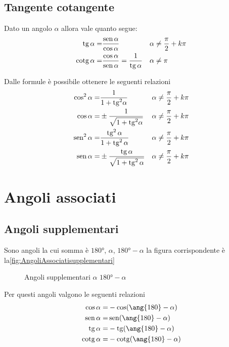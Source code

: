 \subsection{Tangente cotangente}
\label{sec:TangenteCotangente}
\begin{definizione}
	Dato un angolo $\alpha$ allora vale quanto segue:
\begin{align}
\operatorname{tg}\alpha=&{}\dfrac{\operatorname{sen}\alpha}{\cos\alpha}&\alpha&{}\neq\dfrac{\pi}{2}+k\pi\label{equ:tangente1}\\
\operatorname{cotg}\alpha=&{}\dfrac{\cos\alpha}{\operatorname{sen}\alpha}={}\dfrac{1}{\operatorname{tg}\alpha}& \alpha&{}\neq\pi\label{equ:cotangente1}
\end{align}
\end{definizione}
Dalle formule\nobs{} è possibile ottenere le seguenti relazioni
\begin{align}
\cos^{2}\alpha=&{}\dfrac{1}{1+{\operatorname{tg}}^{2}\alpha} &\alpha&{}\neq\dfrac{\pi}{2}+k\pi\\
\cos\alpha=&{}\pm\dfrac{1}{\sqrt{1+{\operatorname{tg}}^{2}\alpha}} &\alpha{}&\neq\dfrac{\pi}{2}+k\pi\\
\operatorname{sen}^{2}\alpha=&{}\dfrac{\operatorname{tg}^{2}\alpha}{1+\operatorname{tg}^{2}\alpha}&\alpha{}&\neq\dfrac{\pi}{2}+k\pi\\
\operatorname{sen}\alpha=&{}\pm\dfrac{\operatorname{tg}\alpha}{\sqrt{1+\operatorname{tg}^{2}\alpha}}&\alpha{}&\neq\dfrac{\pi}{2}+k\pi
\end{align}
\section{Angoli associati}
\label{sec:goniometriaAngoliAssociati}
\subsection{Angoli supplementari}
Sono angoli la cui somma è $\ang{180}$, $\alpha$, $\ang{180}-\alpha$ la figura corrispondente è la\nobs\vref{fig:AngoliAssociatisupplementari}
\begin{figure}[H]
	\centering

	\caption{Angoli supplementari $\alpha$ $\ang{180}-\alpha$}
	\label{fig:AngoliAssociatisupplementari}
\end{figure}
Per questi angoli valgono le seguenti relazioni
\begin{align}
\cos\alpha=&{}-\cos(\ang{180}-\alpha)\\
\sen\alpha=&{}\sen(\ang{180}-\alpha)\\
\tg\alpha=&{}-\tg(\ang{180}-\alpha)\\
\cotg\alpha=&{}-\cotg(\ang{180}-\alpha)
\end{align}
